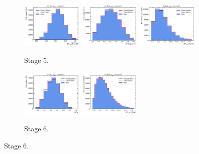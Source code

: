 \begin{figure}[htb]\ContinuedFloat
    \begin{subfigure}{\textwidth}
        \centering
        \includegraphics[width=0.32\textwidth]{./figs-mc-correction/reweighting-final/plot_step5-D0_iso-d0_comp.pdf}
        \includegraphics[width=0.32\textwidth]{./figs-mc-correction/reweighting-final/plot_step5-D0_iso-d0_log_ip_chi2.pdf}
        \includegraphics[width=0.32\textwidth]{./figs-mc-correction/reweighting-final/plot_step5-D0_iso-d0_pt.pdf}
        \caption{Stage 5.}
    \end{subfigure}

    \begin{subfigure}{\textwidth}
        \centering
        \includegraphics[width=0.32\textwidth]{./figs-mc-correction/reweighting-final/plot_step6-D0_iso-d0_eta.pdf}
        \includegraphics[width=0.32\textwidth]{./figs-mc-correction/reweighting-final/plot_step6-D0_iso-d0_pt.pdf}
        \caption{Stage 6.}
    \end{subfigure}


\end{figure}
